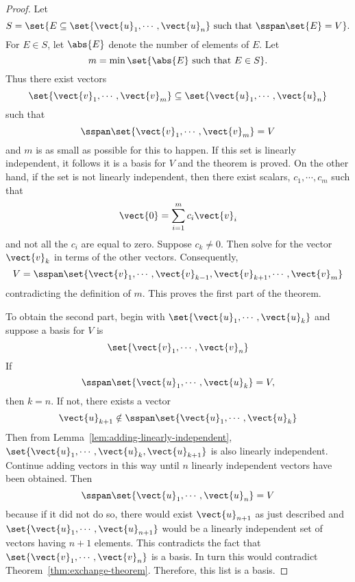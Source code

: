 \begin{proof}Let 
\begin{equation*}
S=\set{E\subseteq \set{\vect{u}_{1},\cdots ,\vect{u}_{n}}\text{ such that }%
\sspan\set{E} =V}.
\end{equation*}
For $E\in S$, let $\abs{E}$ denote the number of elements
of $E$. Let 
\begin{equation*}
m= \min \set{\abs{E}\text{ such that }E\in S}.
\end{equation*}
Thus there exist vectors 
\begin{equation*}
\set{\vect{v}_{1},\cdots ,\vect{v}_{m}}\subseteq \set{\vect{u}_{1},\cdots ,%
\vect{u}_{n}}
\end{equation*}
such that 
\begin{equation*}
\sspan\set{\vect{v}_{1},\cdots ,\vect{v}_{m}} =V
\end{equation*}
and $m$ is as small as possible for this to happen. If this set is linearly
independent, it follows it is a basis for $V$ and the theorem is proved. On
the other hand, if the set is not linearly independent, then there exist
scalars, $c_{1},\cdots ,c_{m}$ such that 
\begin{equation*}
\vect{0}=\sum_{i=1}^{m}c_{i}\vect{v}_{i}
\end{equation*}
and not all the $c_{i}$ are equal to zero. Suppose $c_{k}\neq 0$. Then solve for the
vector $\vect{v}_{k}$ in terms of the other vectors.
Consequently, 
\begin{equation*}
V=\sspan\set{\vect{v}_{1},\cdots ,\vect{v}_{k-1},\vect{v}
_{k+1},\cdots ,\vect{v}_{m}}
\end{equation*}
contradicting the definition of $m$. This proves the first part of the
theorem.

To obtain the second part, begin with $\set{\vect{u}_{1},\cdots ,\vect{u}
_{k}}$ and suppose a basis for $V$ is 
\begin{equation*}
\set{\vect{v}_{1},\cdots ,\vect{v}_{n}} 
\end{equation*}
If 
\begin{equation*}
\sspan\set{\vect{u}_{1},\cdots ,\vect{u}_{k}} =V,
\end{equation*}
then $k=n$. If not, there exists a vector 
\begin{equation*}
\vect{u}_{k+1}\notin \sspan\set{\vect{u}_{1},\cdots ,\vect{u}
_{k}}
\end{equation*}
Then from Lemma~\ref{lem:adding-linearly-independent}, $\set{\vect{u}_{1},\cdots ,\vect{u}_{k},
\vect{u}_{k+1}}$ is also linearly independent. Continue adding vectors in
this way until $n$ linearly independent vectors have been obtained. Then 
\begin{equation*}
\sspan\set{\vect{u}_{1},\cdots ,\vect{u}_{n}} =V
\end{equation*}
because if it did not do so, there would exist $\vect{u}_{n+1}$ as just
described and $\set{\vect{u}_{1},\cdots ,\vect{u}_{n+1}} $
would be a linearly independent set of vectors having $n+1$ elements. This contradicts the fact that $\set{\vect{v}_{1},\cdots ,\vect{v}_{n}} $ is a basis.
 In turn this would contradict Theorem~\ref{thm:exchange-theorem}. Therefore, this list is a
basis. 
\end{proof}

